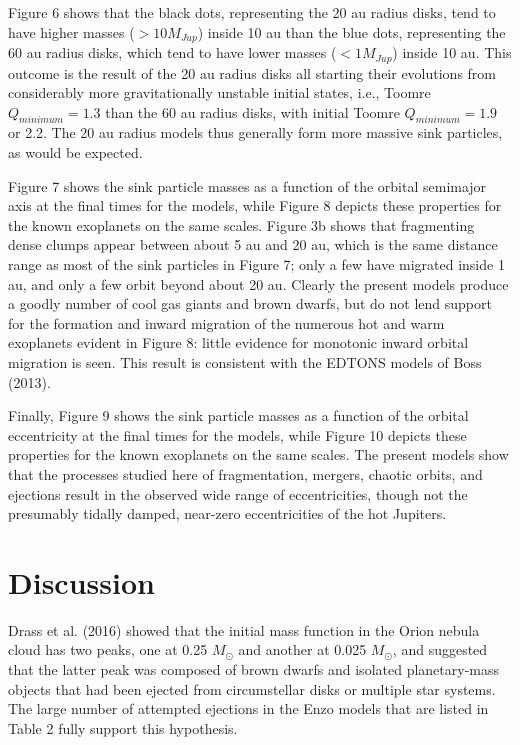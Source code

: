 \documentclass[12pt,preprint]{aastex}
\begin{document}
 Figure 6 shows that the black dots, representing
the 20 au radius disks, tend to have higher masses ($> 10 M_{Jup}$)
inside 10 au than the blue dots, representing the 60 au radius disks,
which tend to have lower masses ($< 1 M_{Jup}$) inside 10 au.
This outcome is the result of the 20 au radius disks all starting
their evolutions from considerably more gravitationally unstable
initial states, i.e., Toomre $Q_{minimum} = 1.3$ than the 60 au radius
disks, with initial Toomre $Q_{minimum} = 1.9$ or 2.2. The 20 au radius
models thus generally form more massive sink particles, as would be
expected.

 Figure 7 shows the sink particle masses as a function of the orbital 
semimajor axis at the final times for the models, while Figure 8
depicts these properties for the known exoplanets on the same
scales. Figure 3b shows that fragmenting dense clumps appear between
about 5 au and 20 au, which is the same distance range as most of the
sink particles in Figure 7; only a few have migrated inside 1 au,
and only a few orbit beyond about 20 au.
Clearly the present models produce a goodly number of
cool gas giants and brown dwarfs, but do not lend support for the
formation and inward migration of the numerous hot and warm exoplanets
evident in Figure 8: little evidence for monotonic inward orbital
migration is seen. This result is consistent with the EDTONS models
of Boss (2013).

 Finally, Figure 9 shows the sink particle masses as a function of the orbital 
eccentricity at the final times for the models, while Figure 10
depicts these properties for the known exoplanets on the same
scales. The present models show that the processes studied here
of fragmentation, mergers, chaotic orbits, and ejections result in
the observed wide range of eccentricities, though not the 
presumably tidally damped, near-zero eccentricities of the hot Jupiters.

\section{Discussion}

 Drass et al. (2016)  showed that the initial mass function in the Orion nebula cloud has two peaks,
one at 0.25 $M_\odot$ and another at 0.025 $M_\odot$, and suggested that the latter peak was
composed of brown dwarfs and isolated planetary-mass objects that had been ejected from circumstellar
disks or multiple star systems. The large number of attempted ejections in the Enzo models
that are listed in Table 2 fully support this hypothesis.
\end{document}
